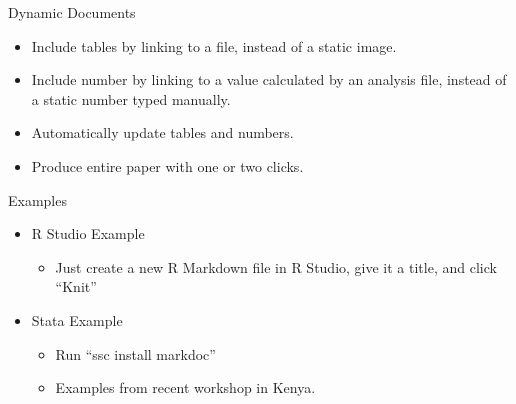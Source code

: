 \documentclass{beamer}
\begin{document}
\begin{frame}{Dynamic Documents}
\begin{itemize}
\item Include tables by linking to a file, instead of a static image.
\item Include number by linking to a value calculated by an analysis file, instead of a static number typed manually.
\item Automatically update tables and numbers.
\item Produce entire paper with one or two clicks.
\end{itemize} 
\end{frame}


\begin{frame}{Examples}
\begin{itemize}
\item
R Studio Example
\begin{itemize}
\item Just create a new R Markdown file in R Studio, give it a title, and click ``Knit''
\end{itemize}
\item
Stata Example
\begin{itemize}
\item Run ``ssc install markdoc''
\item Examples from recent workshop in Kenya.
\href{https://github.com/BITSS/IPA-BITSS-Workshop-2016}{} 
\end{itemize}
\end{itemize}
\end{frame}


\end{document}
